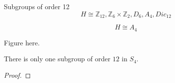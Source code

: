\begin{frame}{Subgroups of order 12}
  \[
    H \cong \mathbb{Z}_{12}, \mathbb{Z}_{6} \times \mathbb{Z}_{2}, D_{6}, A_{4}, Dic_{12}
  \]

  \[
    H \cong A_4
  \]

  \centerline{Figure here.}

  \begin{theorem}
    There is only one subgroup of order $12$ in $S_4$.
  \end{theorem}

  \begin{proof}
  \end{proof}
\end{frame}
